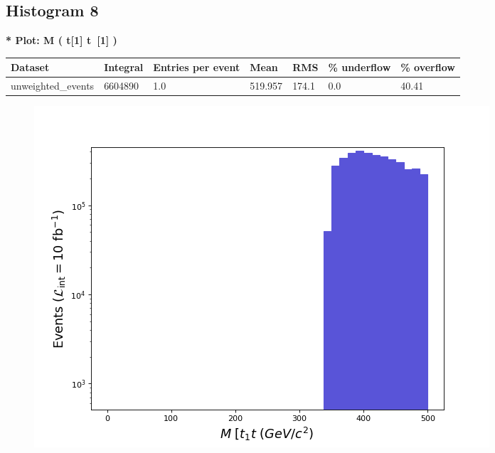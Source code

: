 \documentclass[a4paper, 10pt]{article}
\begin{document}
\subsection{ Histogram 8}

\textbf{* Plot: M ( t[1] t~[1] ) }\\
   \begin{table}[H]
  \begin{center}
    \begin{tabular}{|m{23.0mm}|m{23.0mm}|m{18.0mm}|m{19.0mm}|m{19.0mm}|m{19.0mm}|m{19.0mm}|}
      \hline
      {\cellcolor{yellow}         Dataset}& {\cellcolor{yellow}         Integral}& {\cellcolor{yellow}         Entries per event}& {\cellcolor{yellow}         Mean}& {\cellcolor{yellow}         RMS}& {\cellcolor{yellow}         \% underflow}& {\cellcolor{yellow}         \% overflow}\\
      \hline
      {\cellcolor{white}         unweighted\_events}& {\cellcolor{white}         6604890}& {\cellcolor{white}         1.0}& {\cellcolor{white}         519.957}& {\cellcolor{white}         174.1}& {\cellcolor{red}         0.0}& {\cellcolor{red}         40.41}\\
\hline
    \end{tabular}
  \end{center}
\end{table}

\begin{figure}[H]
  \begin{center}
    \includegraphics[scale=0.45]{selection_7.png}\\
\caption{   }
  \end{center}
\end{figure}
      \newpage
\end{document}
